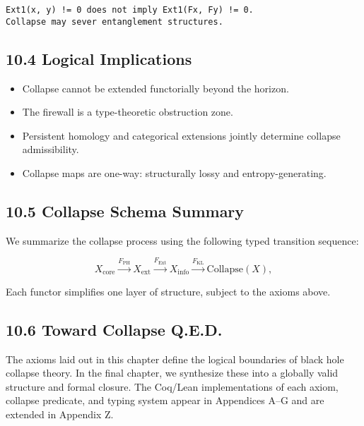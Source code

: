 \documentclass[11pt]{article}
\begin{document}
\begin{lstlisting}
Ext1(x, y) != 0 does not imply Ext1(Fx, Fy) != 0.
Collapse may sever entanglement structures.
\end{lstlisting}


\subsection*{10.4 Logical Implications}

\begin{itemize}
    \item Collapse cannot be extended functorially beyond the horizon.
    \item The firewall is a type-theoretic obstruction zone.
    \item Persistent homology and categorical extensions jointly determine collapse admissibility.
    \item Collapse maps are one-way: structurally lossy and entropy-generating.
\end{itemize}

\subsection*{10.5 Collapse Schema Summary}

We summarize the collapse process using the following typed transition sequence:

\[
X_{\text{core}} \xrightarrow{F_{\mathrm{PH}}}
X_{\text{ext}} \xrightarrow{F_{\mathrm{Ext}}}
X_{\text{info}} \xrightarrow{F_{\mathrm{KL}}}
\mathrm{Collapse}(X),
\]

Each functor simplifies one layer of structure, subject to the axioms above.

\subsection*{10.6 Toward Collapse Q.E.D.}

The axioms laid out in this chapter define the logical boundaries of black hole collapse theory. In the final chapter, we synthesize these into a globally valid structure and formal closure. The Coq/Lean implementations of each axiom, collapse predicate, and typing system appear in Appendices A–G and are extended in Appendix Z.



\end{document}
